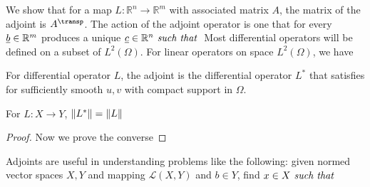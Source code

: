 We show that for a map $L:\mathbb{R}^n\rightarrow\mathbb{R}^m$ with associated matrix $A$, the matrix of the adjoint is $A^\transp$. The action of the adjoint operator is one that for every $\underline{b}\in\mathbb{R}^m$ produces a unique $\underline{c}\in\mathbb{R}^n\textit{ such that }$
Most differential operators will be defined on a subset of $L^2(\Omega)$. For linear operators on space $L^2(\Omega)$, we have
\begin{definition}
    For differential operator $L$, the adjoint is the differential operator $L^*$ that satisfies
    for sufficiently smooth $u,v$ with compact support in $\Omega$.
\end{definition}
\begin{theorem}
    For $L:X\rightarrow Y$, $\norm{L^*} = \norm{L}$
\end{theorem}
\begin{proof}
    Now we prove the converse
\end{proof}
Adjoints are useful in understanding problems like the following: given normed vector spaces $X,Y$ and mapping $\mathcal{L}(X,Y)$ and $b\in Y$, find $x\in X\textit{ such that }$
